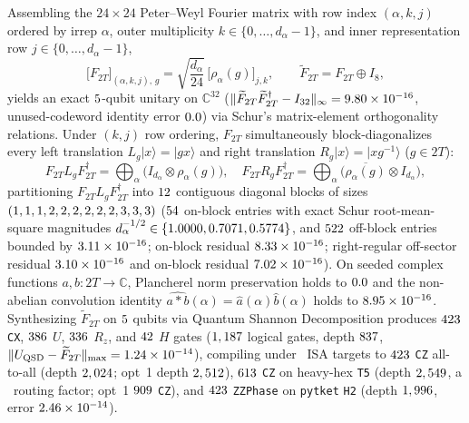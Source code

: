 \documentclass[aps,prx,twocolumn,superscriptaddress,nofootinbib]{revtex4-2}
\begin{document}
Assembling the $24\times 24$ Peter--Weyl Fourier matrix with row index $(\alpha, k, j)$ ordered by irrep $\alpha$, outer multiplicity $k \in \{0,\dots,d_\alpha - 1\}$, and inner representation row $j \in \{0,\dots,d_\alpha - 1\}$,
\begin{equation}
  \bigl[F_{2T}\bigr]_{(\alpha,k,j),\, g} = \sqrt{\frac{d_\alpha}{24}}\,\bigl[\rho_\alpha(g)\bigr]_{j,k}, \qquad
  \widetilde{F}_{2T} = F_{2T} \oplus I_8,
  \label{eq:peter_weyl_qft}
\end{equation}
yields an exact $5$-qubit unitary on $\mathbb{C}^{32}$ ($\|\widetilde{F}_{2T}\widetilde{F}_{2T}^\dagger - I_{32}\|_\infty = 9.80 \times 10^{-16}$, unused-codeword identity error $0.0$) via Schur's matrix-element orthogonality relations. Under $(k,j)$ row ordering, $F_{2T}$ simultaneously block-diagonalizes every left translation $L_g|x\rangle = |gx\rangle$ and right translation $R_g|x\rangle = |xg^{-1}\rangle$ ($g \in 2T$):
\begin{equation}
  F_{2T} L_g F_{2T}^\dagger = \bigoplus_{\alpha} \bigl(I_{d_\alpha} \otimes \rho_\alpha(g)\bigr), \quad
  F_{2T} R_g F_{2T}^\dagger = \bigoplus_{\alpha} \bigl(\overline{\rho_\alpha(g)} \otimes I_{d_\alpha}\bigr),
  \label{eq:block_diag}
\end{equation}
partitioning $F_{2T} L_g F_{2T}^\dagger$ into $12$ contiguous diagonal blocks of sizes $(1, 1, 1, 2, 2, 2, 2, 2, 2, 3, 3, 3)$ ($54$ on-block entries with exact Schur root-mean-square magnitudes $d_\alpha^{-1/2} \in \{1.0000, 0.7071, 0.5774\}$, and $522$ off-block entries bounded by $3.11 \times 10^{-16}$; on-block residual $8.33 \times 10^{-16}$; right-regular off-sector residual $3.10 \times 10^{-16}$ and on-block residual $7.02 \times 10^{-16}$). On seeded complex functions $a, b : 2T \to \mathbb{C}$, Plancherel norm preservation holds to $0.0$ and the non-abelian convolution identity $\widehat{a * b}(\alpha) = \widehat{a}(\alpha)\widehat{b}(\alpha)$ holds to $8.95 \times 10^{-16}$. Synthesizing $\widetilde{F}_{2T}$ on $5$ qubits via Quantum Shannon Decomposition produces $423$ \texttt{CX}, $386$ $U$, $336$ $R_z$, and $42$ $H$ gates ($1,187$ logical gates, depth $837$, $\|U_{\mathrm{QSD}} - \widetilde{F}_{2T}\|_{\max} = 1.24 \times 10^{-14}$), compiling under \btmProxyTier\ ISA targets to $423$ \texttt{CZ} all-to-all (depth $2,024$; opt~1 depth $2,512$), $613$ \texttt{CZ} on heavy-hex \texttt{T5} (depth $2,549$, a \btmQftTfOverhead\ routing factor; opt~1 $909$ \texttt{CZ}), and $423$ \texttt{ZZPhase} on \texttt{pytket} \texttt{H2} (depth $1,996$, error $2.46 \times 10^{-14}$).
\end{document}
